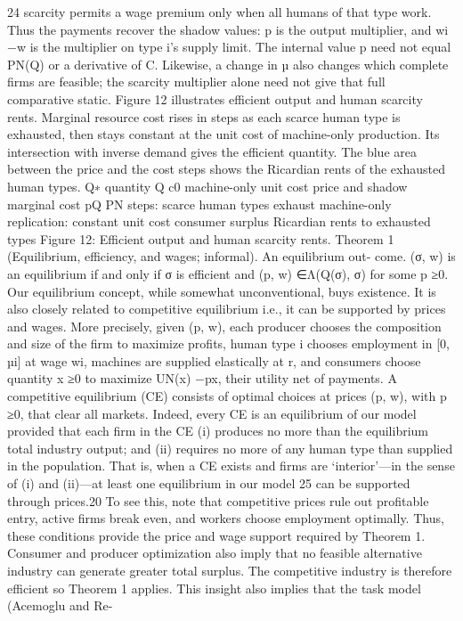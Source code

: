 24
scarcity permits a wage premium only when all humans of that type work. Thus the
payments recover the shadow values: p is the output multiplier, and wi −w is the
multiplier on type i’s supply limit. The internal value p need not equal PN(Q) or a
derivative of C. Likewise, a change in µ also changes which complete firms are feasible;
the scarcity multiplier alone need not give that full comparative static.
Figure 12 illustrates efficient
output and human scarcity rents.
Marginal resource cost rises in
steps as each scarce human type is
exhausted, then stays constant at
the unit cost of machine-only
production. Its intersection with
inverse demand gives the efficient
quantity. The blue area between
the price and the cost steps shows
the Ricardian rents of the
exhausted human types.
Q∗
quantity Q
c0
machine-only
unit cost
price and shadow marginal cost pQ
PN
steps: scarce human types exhaust
machine-only replication: constant unit cost
consumer surplus
Ricardian rents to
exhausted types
Figure 12: Efficient output and human scarcity
rents.
Theorem 1 (Equilibrium, efficiency, and wages; informal). An equilibrium out-
come. (σ, w) is an equilibrium if and only if σ is efficient and
(p, w) ∈Λ(Q(σ), σ)
for some p ≥0.
Our equilibrium concept, while somewhat unconventional, buys existence. It is also
closely related to competitive equilibrium i.e., it can be supported by prices and
wages. More precisely, given (p, w), each producer chooses the composition and size
of the firm to maximize profits, human type i chooses employment in [0, µi] at wage
wi, machines are supplied elastically at r, and consumers choose quantity x ≥0 to
maximize UN(x) −px, their utility net of payments. A competitive equilibrium (CE)
consists of optimal choices at prices (p, w), with p ≥0, that clear all markets.
Indeed, every CE is an equilibrium of our model provided that each firm in the CE (i)
produces no more than the equilibrium total industry output; and (ii) requires no more
of any human type than supplied in the population. That is, when a CE exists and
firms are ‘interior’—in the sense of (i) and (ii)—at least one equilibrium in our model
25
can be supported through prices.20 To see this, note that competitive prices rule out
profitable entry, active firms break even, and workers choose employment optimally.
Thus, these conditions provide the price and wage support required by Theorem 1.
Consumer and producer optimization also imply that no feasible alternative industry
can generate greater total surplus. The competitive industry is therefore efficient so
Theorem 1 applies. This insight also implies that the task model (Acemoglu and Re-
